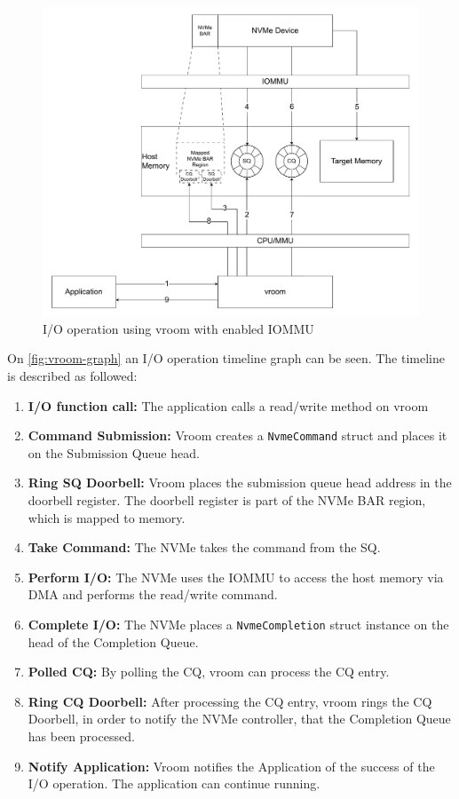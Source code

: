 \begin{figure}
    \centering
    \includegraphics[width=\textwidth]{figures/vroomdiagram.pdf}
    \caption{I/O operation using vroom with enabled IOMMU}
    \label{fig:vroom-graph}
\end{figure}
On \autoref{fig:vroom-graph} an I/O operation timeline graph can be seen. The timeline is described as followed:
\begin{enumerate}
    \item \textbf{I/O function call:} The application calls a read/write method on vroom
    \item \textbf{Command Submission:} Vroom creates a \texttt{NvmeCommand} struct and places it on the Submission Queue head.
    \item \textbf{Ring SQ Doorbell:} Vroom places the submission queue head address in the doorbell register. The doorbell register is part of the NVMe BAR region, which is mapped to memory.
    \item \textbf{Take Command:} The NVMe takes the command from the SQ.
    \item \textbf{Perform I/O:} The NVMe uses the IOMMU to access the host memory via DMA and performs the read/write command.
    \item \textbf{Complete I/O:} The NVMe places a \texttt{NvmeCompletion} struct instance on the head of the Completion Queue.
    \item \textbf{Polled CQ:} By polling the CQ, vroom can process the CQ entry.
    \item \textbf{Ring CQ Doorbell:} After processing the CQ entry, vroom rings the CQ Doorbell, in order to notify the NVMe controller, that the Completion Queue has been processed.
    \item \textbf{Notify Application:} Vroom notifies the Application of the success of the I/O operation. The application can continue running.
\end{enumerate}



